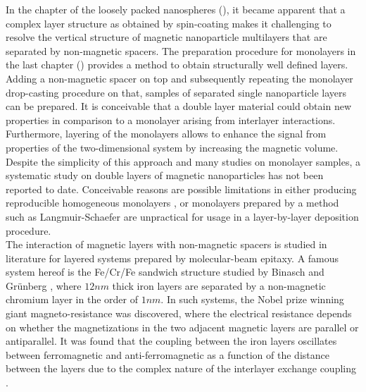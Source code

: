 \documentclass[\main/dresen_thesis.tex]{subfiles}
\begin{document}
  In the chapter of the loosely packed nanospheres (), it became apparent that a complex layer structure as obtained by spin-coating makes it challenging to resolve the vertical structure of magnetic nanoparticle multilayers that are separated by non-magnetic spacers.
  The preparation procedure for monolayers in the last chapter () provides a method to obtain structurally well defined layers.
  Adding a non-magnetic spacer on top and subsequently repeating the monolayer drop-casting procedure on that, samples of separated single nanoparticle layers can be prepared.
  It is conceivable that a double layer material could obtain new properties in comparison to a monolayer arising from interlayer interactions.
  Furthermore, layering of the monolayers allows to enhance the signal from properties of the two-dimensional system by increasing the magnetic volume.
  Despite the simplicity of this approach and many studies on monolayer samples, a systematic study on double layers of magnetic nanoparticles has not been reported to date.
  Conceivable reasons are possible limitations in either producing reproducible homogeneous monolayers \cite{Mishra_2015_Polar, Bodnarchuk_2010_Large}, or monolayers prepared by a method such as Langmuir-Schaefer \cite{Ukleev_2017_Polar} are unpractical for usage in a layer-by-layer deposition procedure.
  \\

  The interaction of magnetic layers with non-magnetic spacers is studied in literature for layered systems prepared by molecular-beam epitaxy.
  A famous system hereof is the Fe/Cr/Fe sandwich structure studied by Binasch and Gr\"unberg \etal \cite{Binasch_1989_Enhan}, where $12 \unit{nm}$ thick iron layers are separated by a non-magnetic chromium layer in the order of  $1 \unit{nm}$.
  In such systems, the Nobel prize winning giant magneto-resistance was discovered, where the electrical resistance depends on whether the magnetizations in the two adjacent magnetic layers are parallel or antiparallel.
  It was found that the coupling between the iron layers oscillates between ferromagnetic and anti-ferromagnetic as a function of the distance between the layers due to the complex nature of the interlayer exchange coupling \cite{Demokritov_1998_Biqua}.
\end{document}
